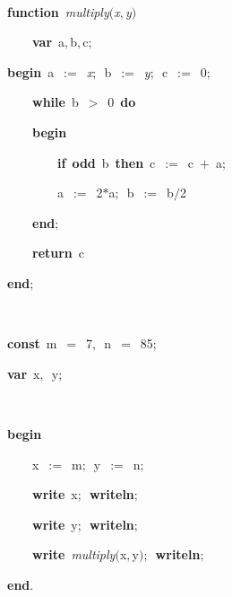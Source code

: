 
\fboxsep=0pt
\def\insert#1{$\fbox{#1}$}
\def\delete#1{$\fboxrule=.5mm\fbox{#1}$}
\rm
\ \par
{\bf function}\ {\it multiply}$(${\sl x}$,${\sl y}$)$\ \par
\ \ \ \ {\bf var}\ a$,$b$,$c$;$\ \par
{\bf begin}\ a\ $:=$\ {\sl x}$;$\ b\ $:=$\ {\sl y}$;$\ c\ $:=$\ 0$;$\ \par
\ \ \ \ {\bf while}\ b\ $>$\ 0\ {\bf do}\ \par
\ \ \ \ {\bf begin}\ \par
\ \ \ \ \ \ \ \ {\bf if}\ {\bf odd}\ b\ {\bf then}\ c\ $:=$\ c\ $+$\ a$;$\ \par
\ \ \ \ \ \ \ \ a\ $:=$\ 2$*$a$;$\ b\ $:=$\ b$/$2\ \par
\ \ \ \ {\bf end}$;$\ \par
\ \ \ \ {\bf return}\ c\ \par
{\bf end}$;$\ \par
\ \par
{\bf const}\ {\sf m}\ $=$\ 7$,$\ {\sf n}\ $=$\ 85$;$\ \par
{\bf var}\ x$,$\ y$;$\ \par
\ \par
{\bf begin}\ \par
\ \ \ \ x\ $:=$\ {\sf m}$;$\ y\ $:=$\ {\sf n}$;$\ \par
\ \ \ \ {\bf write}\ x$;$\ {\bf writeln}$;$\ \par
\ \ \ \ {\bf write}\ y$;$\ {\bf writeln}$;$\ \par
\ \ \ \ {\bf write}\ {\it multiply}$($x$,$y$)$$;$\ {\bf writeln}$;$\ \par
{\bf end}$.$


